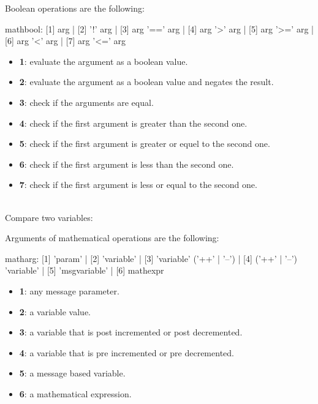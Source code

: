 Boolean operations are the following:
\begin{rail}
mathbool:     [1] arg
			| [2] '!' arg
			| [3] arg '==' arg
			| [4] arg '>' arg
			| [5] arg '>=' arg
			| [6] arg '<' arg
			| [7] arg '<=' arg
\end{rail}

\begin{itemize}
\item \textbf{1}: evaluate the argument as a boolean value.
\item \textbf{2}: evaluate the argument as a boolean value and negates the result.
\item \textbf{3}: check if the arguments are equal.
\item \textbf{4}: check if the first argument is greater than the second one.
\item \textbf{5}: check if the first argument is greater or equel to the second one.
\item \textbf{6}: check if the first argument is less than the second one.
\item \textbf{7}: check if the first argument is less or equal to the second one.
\end{itemize}

\example\\
Compare two variables:


\label{mathargs}

Arguments of mathematical operations are the following:

\begin{rail}
matharg:      [1] 'param'
			| [2] 'variable'
			| [3] 'variable' ('++' | '--')
			| [4] ('++' | '--') 'variable' 
			| [5] 'msgvariable'
			| [6] mathexpr
\end{rail}
\begin{itemize}
\item \textbf{1}: any message parameter.
\item \textbf{2}: a variable value.
\item \textbf{3}: a variable that is post incremented or post decremented.
\item \textbf{4}: a variable that is pre incremented or pre decremented.
\item \textbf{5}: a message based variable.
\item \textbf{6}: a mathematical expression.
\end{itemize}



